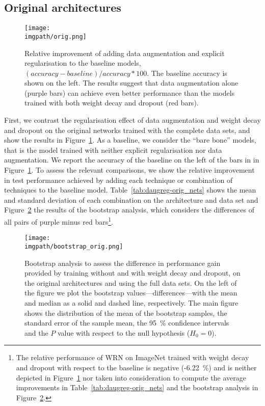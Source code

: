 {\subsection{Original architectures}
\label{sec:daugreg-orig}
%
\begin{figure}[htb]
  \begin{center}
    \texttt{[image: \\imgpath/orig.png]}
  \end{center}
  \caption{Relative improvement of adding data augmentation and explicit regularisation to the baseline models, $(accuracy - baseline)/accuracy * 100$. The baseline accuracy is shown on the left. The results suggest that data augmentation alone (purple bars) can achieve even better performance than the models trained with both weight decay and dropout (red bars).}
  \label{fig:daugreg-orig}
\end{figure}

First, we contrast the regularisation effect of data augmentation and weight decay and dropout on the original networks trained with the complete data sets, and show the results in Figure~\ref{fig:daugreg-orig}. As a baseline, we consider the ``bare bone'' models, that is the model trained with neither explicit regularisation nor data augmentation. We report the accuracy of the baseline on the left of the bars in in Figure~\ref{fig:daugreg-orig}. To assess the relevant comparisons, we show the relative improvement in test performance achieved by adding each technique or combination of techniques to the baseline model. Table~\ref{tab:daugreg-orig_nets} shows the mean and standard deviation of each combination on the architecture and data set and Figure~\ref{fig:daugreg-bootstrap_orig} the results of the bootstrap analysis, which considers the differences of all pairs of purple minus red bars\footnote{The relative performance of WRN on ImageNet trained with weight decay and dropout with respect to the baseline is negative (-6.22~\%) and is neither depicted in Figure~\ref{fig:daugreg-orig} nor taken into consideration to compute the average improvements in Table~\ref{tab:daugreg-orig_nets} and the bootstrap analysis in Figure~\ref{fig:daugreg-bootstrap_orig}.}.

\begin{figure}[ht]
  \centering
  \begin{center}
    \texttt{[image: \\imgpath/bootstrap\_orig.png]}
  \end{center}
  \caption{Bootstrap analysis to assess the difference in performance gain provided by training without and with weight decay and dropout, on the original architectures and using the full data sets. On the left of the figure we plot the bootstrap values---differences---with the mean and median as a solid and dashed line, respectively. The main figure shows the distribution of the mean of the bootstrap samples, the standard error of the sample mean, the 95~\% confidence intervals and the $P$ value with respect to the null hypothesis ($H_0=0$).}
  \label{fig:daugreg-bootstrap_orig}
\end{figure}

}
